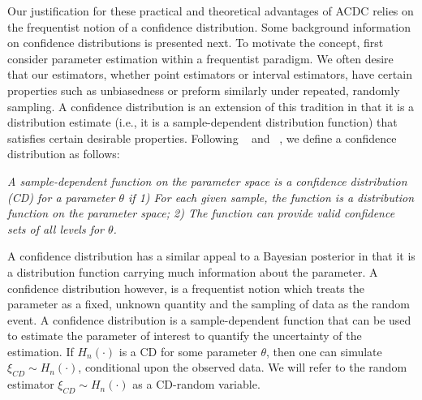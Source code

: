 Our justification for these practical and theoretical advantages of ACDC relies on the frequentist notion of a confidence distribution. Some background information on confidence distributions is presented next. To motivate the concept, first consider parameter estimation within a frequentist paradigm. We often desire that our estimators, whether point estimators or interval estimators, have certain properties such as unbiasedness or preform similarly under repeated, randomly sampling. A confidence distribution is an extension of this tradition in that it is a distribution estimate (i.e., it is a sample-dependent distribution function) that satisfies certain desirable properties. Following ~\cite{Xie2013} and ~\cite{Schweder2016}, we define a confidence distribution as follows:
	
{ {\it A sample-dependent function on the parameter space is a {\sc confidence distribution (CD)} for a parameter $\theta$ if 1) For each given sample, the function is a distribution function on the parameter space; 2) The function can provide valid confidence sets of all levels for $\theta$.} } 
	
A confidence distribution has a similar appeal to a Bayesian posterior in that it is a distribution function carrying much information about the parameter. A confidence distribution however, is a frequentist notion which treats the parameter as a fixed, unknown quantity and the sampling of data as the random event. %
A confidence distribution is a sample-dependent function that can be used to estimate the parameter of interest to quantify the uncertainty of the estimation. If $H_n(\cdot)$ is a CD for some parameter $\theta$, then one can simulate $\xi_{CD} \sim H_n{(\cdot)}$, conditional upon the observed data. We will refer to the random estimator $\xi_{CD} \sim H_n{(\cdot)}$ as a {\sc CD-random variable}. 



